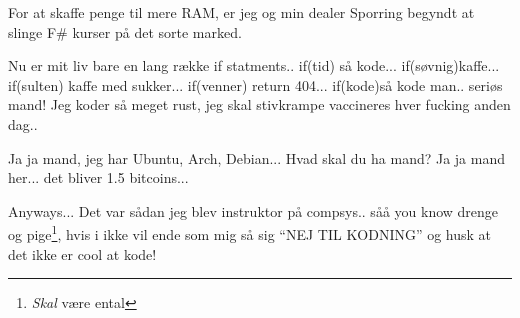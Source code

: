\documentclass[a4paper,11pt]{article}
\begin{document}
\begin{sketch}
 For at skaffe penge til mere RAM, er jeg og min dealer Sporring begyndt at slinge F\# kurser på det sorte marked.

 Nu er mit liv bare en lang række if statments.. if(tid) så kode... if(søvnig)kaffe... if(sulten) kaffe med sukker... if(venner) return 404... if(kode)så kode man.. seriøs mand! Jeg koder så meget rust, jeg skal stivkrampe vaccineres hver fucking anden dag..

 Ja ja mand, jeg har Ubuntu, Arch, Debian... Hvad skal du ha mand?
 Ja ja mand her... det bliver 1.5 bitcoins...

 Anyways... Det var sådan jeg blev instruktor på compsys.. såå you know drenge og pige\footnote{\emph{Skal} være ental}, hvis i ikke vil ende som mig så sig ``NEJ TIL KODNING'' og husk at det ikke er cool at kode!


\end{sketch}
\end{document}
